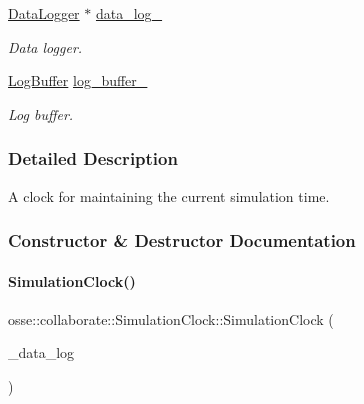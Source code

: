 \begin{DoxyCompactItemize}
\hyperlink{classosse_1_1collaborate_1_1_data_logger}{Data\+Logger} $\ast$ \hyperlink{classosse_1_1collaborate_1_1_simulation_clock_a99bb1f5a13702f64b1b553ef6eacdbf6}{data\+\_\+log\+\_\+}
\begin{DoxyCompactList}\small\item\em Data logger. \end{DoxyCompactList}\item 
\mbox{\label{classosse_1_1collaborate_1_1_simulation_clock_a9c5e6f891b9cdec50f0ec280444458d0}} 
\hyperlink{structosse_1_1collaborate_1_1_simulation_clock_1_1_log_buffer}{Log\+Buffer} \hyperlink{classosse_1_1collaborate_1_1_simulation_clock_a9c5e6f891b9cdec50f0ec280444458d0}{log\+\_\+buffer\+\_\+}
\begin{DoxyCompactList}\small\item\em Log buffer. \end{DoxyCompactList}\end{DoxyCompactItemize}


\subsubsection{Detailed Description}
A clock for maintaining the current simulation time. 

\subsubsection{Constructor \& Destructor Documentation}
\mbox{\label{classosse_1_1collaborate_1_1_simulation_clock_a538621acdc4673f7463f2fa16622f7b9}} 
\paragraph{\texorpdfstring{Simulation\+Clock()}{SimulationClock()}\hspace{0.1cm}{\footnotesize\ttfamily [1/3]}}
{\footnotesize\ttfamily osse\+::collaborate\+::\+Simulation\+Clock\+::\+Simulation\+Clock (\begin{DoxyParamCaption}\item[{\hyperlink{classosse_1_1collaborate_1_1_data_logger}{Data\+Logger} $\ast$}]{\+\_\+data\+\_\+log }\end{DoxyParamCaption})\hspace{0.3cm}{\ttfamily [explicit]}}



